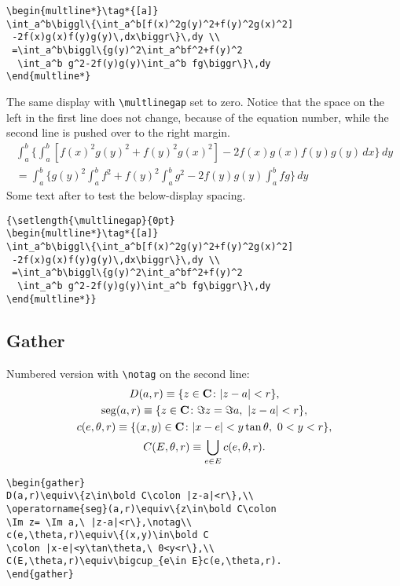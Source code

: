 \begin{verbatim}
\begin{multline*}\tag*{[a]}
\int_a^b\biggl\{\int_a^b[f(x)^2g(y)^2+f(y)^2g(x)^2]
 -2f(x)g(x)f(y)g(y)\,dx\biggr\}\,dy \\
 =\int_a^b\biggl\{g(y)^2\int_a^bf^2+f(y)^2
  \int_a^b g^2-2f(y)g(y)\int_a^b fg\biggr\}\,dy
\end{multline*}
\end{verbatim}

The same display with \verb=\multlinegap= set to zero.
Notice that the space on the left in
the first line does not change, because of the equation number, while
the second line is pushed over to the right margin.
{\setlength{\multlinegap}{0pt}
\begin{multline*}\tag*{[a]}
\int_a^b\biggl\{\int_a^b[f(x)^2g(y)^2+f(y)^2g(x)^2]
 -2f(x)g(x)f(y)g(y)\,dx\biggr\}\,dy \\
 =\int_a^b\biggl\{g(y)^2\int_a^bf^2+f(y)^2
  \int_a^b g^2-2f(y)g(y)\int_a^b fg\biggr\}\,dy
\end{multline*}}%
Some text after to test the below-display spacing.

\begin{verbatim}
{\setlength{\multlinegap}{0pt}
\begin{multline*}\tag*{[a]}
\int_a^b\biggl\{\int_a^b[f(x)^2g(y)^2+f(y)^2g(x)^2]
 -2f(x)g(x)f(y)g(y)\,dx\biggr\}\,dy \\
 =\int_a^b\biggl\{g(y)^2\int_a^bf^2+f(y)^2
  \int_a^b g^2-2f(y)g(y)\int_a^b fg\biggr\}\,dy
\end{multline*}}
\end{verbatim}

\subsection{Gather}
Numbered version with \verb;\notag; on the second line:
\begin{gather}
D(a,r)\equiv\{z\in\bold C\colon |z-a|<r\},\\
\operatorname{seg}(a,r)\equiv\{z\in\bold C\colon
\Im z= \Im a,\ |z-a|<r\},\notag\\
c(e,\theta,r)\equiv\{(x,y)\in\bold C
\colon |x-e|<y\tan\theta,\ 0<y<r\},\\
C(E,\theta,r)\equiv\bigcup_{e\in E}c(e,\theta,r).
\end{gather}
\begin{verbatim}
\begin{gather}
D(a,r)\equiv\{z\in\bold C\colon |z-a|<r\},\\
\operatorname{seg}(a,r)\equiv\{z\in\bold C\colon
\Im z= \Im a,\ |z-a|<r\},\notag\\
c(e,\theta,r)\equiv\{(x,y)\in\bold C
\colon |x-e|<y\tan\theta,\ 0<y<r\},\\
C(E,\theta,r)\equiv\bigcup_{e\in E}c(e,\theta,r).
\end{gather}
\end{verbatim}


